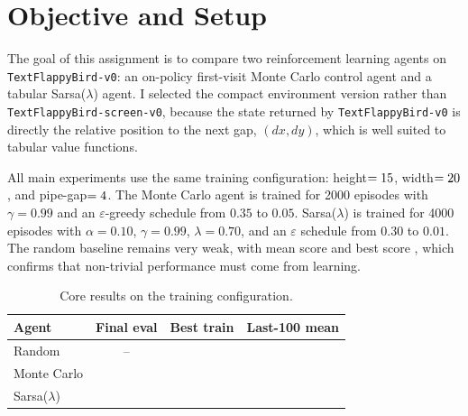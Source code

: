 \documentclass[10pt,a4paper,twocolumn]{article}
\begin{document}

\section*{Objective and Setup}
The goal of this assignment is to compare two reinforcement learning agents on \texttt{TextFlappyBird-v0}: an on-policy first-visit Monte Carlo control agent and a tabular Sarsa($\lambda$) agent. I selected the compact environment version rather than \texttt{TextFlappyBird-screen-v0}, because the state returned by \texttt{TextFlappyBird-v0} is directly the relative position to the next gap, $(dx,dy)$, which is well suited to tabular value functions.

All main experiments use the same training configuration: height$=15$, width$=20$, and pipe-gap$=4$. The Monte Carlo agent is trained for 2000 episodes with $\gamma=0.99$ and an $\varepsilon$-greedy schedule from $0.35$ to $0.05$. Sarsa($\lambda$) is trained for 4000 episodes with $\alpha=0.10$, $\gamma=0.99$, $\lambda=0.70$, and an $\varepsilon$ schedule from $0.30$ to $0.01$. The random baseline remains very weak, with mean score \BaselineMeanScore{} and best score \BaselineBestScore{}, which confirms that non-trivial performance must come from learning.

\begin{table}[t]
\centering
\caption{Core results on the training configuration.}
\begin{tabular}{lccc}
\toprule
Agent & Final eval & Best train & Last-100 mean \\
\midrule
Random & -- & \BaselineBestScore{} & \BaselineMeanScore{} \\
Monte Carlo & \MCFinalEval{} & \MCBestTrain{} & \MCLastHundred{} \\
Sarsa($\lambda$) & \SarsaFinalEval{} & \SarsaBestTrain{} & \SarsaLastHundred{} \\
\bottomrule
\end{tabular}
\end{table}
\end{document}
